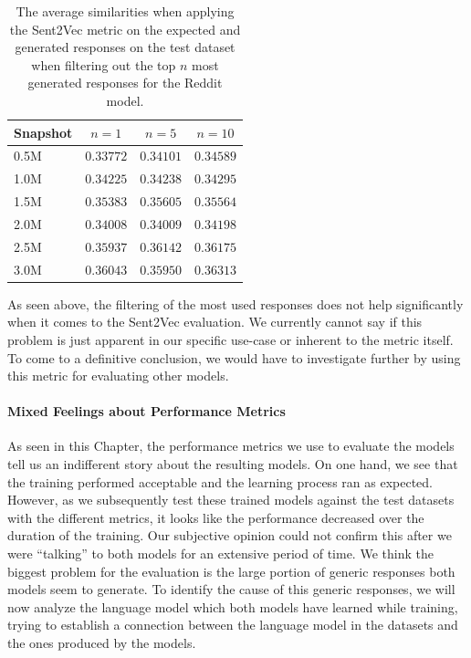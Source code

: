 \begin{table}[H]
	\centering
	\begin{adjustbox}{max width=\textwidth}
		\begin{tabular}{lccc}
			\toprule
			Snapshot & $n = 1$ & $n = 5$ & $n = 10$\\
			\midrule
			0.5M & $0.33772$ & $0.34101$ & $0.34589$\\
			1.0M & $0.34225$ & $0.34238$ & $0.34295$\\
			1.5M & $0.35383$ & $0.35605$ & $0.35564$\\
			2.0M & $0.34008$ & $0.34009$ & $0.34198$\\
			2.5M & $0.35937$ & $0.36142$ & $0.36175$\\
			3.0M & $0.36043$ & $0.35950$ & $0.36313$\\
			\bottomrule
		\end{tabular}
	\end{adjustbox}
	\caption{The average similarities when applying the Sent2Vec metric on the expected and generated responses on the test dataset when filtering out the top $n$ most generated responses for the Reddit model.}
	\label{results:sent2vec:reddit:top_n_results_table}
\end{table}

As seen above, the filtering of the most used responses does not help significantly when it comes to the Sent2Vec evaluation. We currently cannot say if this problem is just apparent in our specific use-case or inherent to the metric itself. To come to a definitive conclusion, we would have to investigate further by using this metric for evaluating other models.

\paragraph{Mixed Feelings about Performance Metrics} As seen in this Chapter, the performance metrics we use to evaluate the models tell us an indifferent story about the resulting models. On one hand, we see that the training performed acceptable and the learning process ran as expected. However, as we subsequently test these trained models against the test datasets with the different metrics, it looks like the performance decreased over the duration of the training. Our subjective opinion could not confirm this after we were ``talking'' to both models for an extensive period of time. We think the biggest problem for the evaluation is the large portion of generic responses both models seem to generate. To identify the cause of this generic responses, we will now analyze the language model which both models have learned while training, trying to establish a connection between the language model in the datasets and the ones produced by the models.

